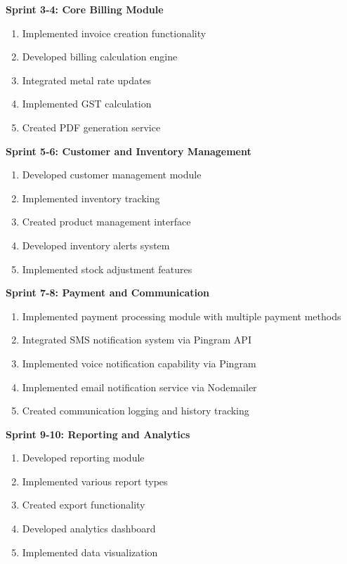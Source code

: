 \documentclass[12pt,a4paper]{report}
\begin{document}
\textbf{Sprint 3-4: Core Billing Module}
\begin{enumerate}[label=\roman*)]
    \item Implemented invoice creation functionality
    \item Developed billing calculation engine
    \item Integrated metal rate updates
    \item Implemented GST calculation
    \item Created PDF generation service
\end{enumerate}

\textbf{Sprint 5-6: Customer and Inventory Management}
\begin{enumerate}[label=\roman*)]
    \item Developed customer management module
    \item Implemented inventory tracking
    \item Created product management interface
    \item Developed inventory alerts system
    \item Implemented stock adjustment features
\end{enumerate}

\textbf{Sprint 7-8: Payment and Communication}
\begin{enumerate}[label=\roman*)]
    \item Implemented payment processing module with multiple payment methods
    \item Integrated SMS notification system via Pingram API
    \item Implemented voice notification capability via Pingram
    \item Implemented email notification service via Nodemailer
    \item Created communication logging and history tracking
\end{enumerate}

\textbf{Sprint 9-10: Reporting and Analytics}
\begin{enumerate}[label=\roman*)]
    \item Developed reporting module
    \item Implemented various report types
    \item Created export functionality
    \item Developed analytics dashboard
    \item Implemented data visualization
\end{enumerate}
\end{document}
